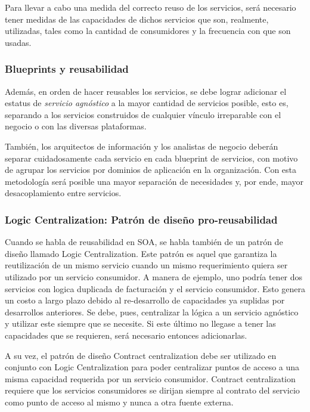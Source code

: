 Para llevar a cabo una medida del correcto reuso de los servicios, será necesario tener medidas de las capacidades de dichos servicios que son, realmente, utilizadas, tales como la cantidad de consumidores y la frecuencia con que son usadas.

\subsubsection{Blueprints y reusabilidad}

Además, en orden de hacer reusables los servicios, se debe lograr adicionar el estatus de \textit{servicio agnóstico} a la mayor cantidad de servicios posible, esto es, separando a los servicios construidos de cualquier vínculo irreparable con el negocio o con las diversas plataformas.

También, los arquitectos de información y los analistas de negocio deberán separar cuidadosamente cada servicio en cada blueprint de servicios, con motivo de agrupar los servicios por dominios de aplicación en la organización. Con esta metodología será posible una mayor separación de necesidades y, por ende, mayor desacoplamiento entre servicios.

\subsubsection{Logic Centralization: Patrón de diseño pro-reusabilidad}

Cuando se habla de reusabilidad en SOA, se habla también de un patrón de diseño llamado Logic Centralization. Este patrón es aquel que garantiza la reutilización de un mismo servicio cuando un mismo requerimiento quiera ser utilizado por un servicio consumidor. A manera de ejemplo, uno podría tener dos servicios con logica duplicada de facturación y el servicio consumidor. Esto genera un costo a largo plazo debido al re-desarrollo de capacidades ya suplidas por desarrollos anteriores. Se debe, pues, centralizar la lógica a un servicio agnóstico y utilizar este siempre que se necesite. Si este último no llegase a tener las capacidades que se requieren, será necesario entonces adicionarlas.

A su vez, el patrón de diseño Contract centralization debe ser utilizado en conjunto con Logic Centralization para poder centralizar puntos de acceso a una misma capacidad requerida por un servicio consumidor. Contract centralization requiere que los servicios consumidores se dirijan siempre al contrato del servicio como punto de acceso al mismo y nunca a otra fuente externa.


